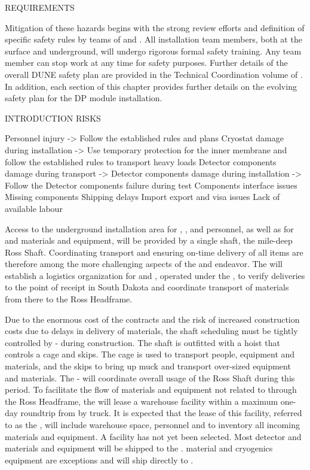 REQUIREMENTS

Mitigation of these hazards begins with the strong review efforts and definition of specific safety rules by  teams of  and \surf.
All installation team members, both at the surface and underground, will undergo rigorous formal safety training.
Any team member can stop work at any time for safety purposes.
Further details of the overall DUNE safety plan are provided in the Technical Coordination volume of .
In addition, each section of this chapter provides further details on the evolving safety plan for the DP module installation.

INTRODUCTION RISKS

Personnel injury -> Follow the established rules and plans
Cryostat damage during installation -> Use temporary protection for the inner membrane and follow the established rules to transport heavy loads
Detector components damage during transport -> 
Detector components damage during installation -> Follow the
Detector components failure during test
Components interface issues
Missing components
Shipping delays
Import export and visa issues
Lack of available labour

Access to the underground installation area for , , and  personnel, as well as for  and  materials and equipment, will be provided by a single shaft, the mile-deep Ross Shaft.
Coordinating transport and ensuring on-time delivery of all items are therefore among the more challenging aspects of the  and  endeavor.
The  will establish a logistics organization for  and , operated under the , to verify deliveries to the point of receipt in South Dakota and coordinate transport of materials from there to the Ross Headframe.

Due to the enormous cost of the  contracts and the risk of increased construction costs due to delays in delivery of materials, the shaft scheduling must be tightly controlled by - during construction.
The shaft is outfitted with a hoist that controls a cage and skips.
The cage is used to transport people, equipment and materials, and the skips to bring up muck and transport over-sized equipment and materials.
The -  will coordinate overall usage of the Ross Shaft during this period.
To facilitate the flow of materials and equipment not related to  through the Ross Headframe, the  will lease a warehouse facility within a maximum one-day roundtrip from  by truck.
It is expected that the lease of this facility, referred to as the , will include warehouse space, personnel and  to inventory all incoming materials and equipment.
A facility has not yet been selected.
Most detector and materials and equipment will be shipped to the .
 material and cryogenics equipment are exceptions and will ship directly to .

